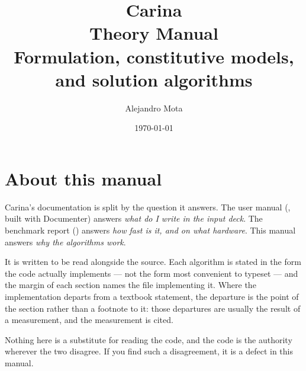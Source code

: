 \documentclass[11pt,oneside]{book}
\title{\textbf{Carina}\\[0.4em]
       \large Theory Manual\\[0.3em]
       \normalsize Formulation, constitutive models, and solution algorithms}
\author{Alejandro Mota}
\date{\today}
\begin{document}
\maketitle

\frontmatter
\chapter*{About this manual}

Carina's documentation is split by the question it answers.  The user manual
(, built with Documenter) answers \emph{what do I write in the input
deck}.  The benchmark report () answers \emph{how
fast is it, and on what hardware}.  This manual answers \emph{why the
algorithms work}.

It is written to be read alongside the source.  Each algorithm is stated in the
form the code actually implements --- not the form most convenient to typeset
--- and the margin of each section names the file implementing it.  Where the
implementation departs from a textbook statement, the departure is the point of
the section rather than a footnote to it: those departures are usually the
result of a measurement, and the measurement is cited.

Nothing here is a substitute for reading the code, and the code is the
authority wherever the two disagree.  If you find such a disagreement, it is a
defect in this manual.

\tableofcontents

\mainmatter













\backmatter


\end{document}
